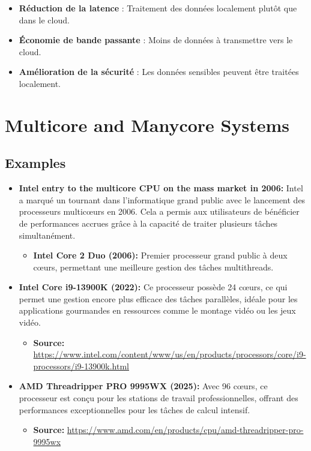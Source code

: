 \documentclass[10pt,a4paper]{article}
\begin{document}
\begin{itemize}
    \item \textbf{Réduction de la latence} : Traitement des données localement plutôt que dans le cloud.
    \item \textbf{Économie de bande passante} : Moins de données à transmettre vers le cloud.
    \item \textbf{Amélioration de la sécurité} : Les données sensibles peuvent être traitées localement.
\end{itemize}


\section*{Multicore and Manycore Systems}

\subsection*{Examples}

\begin{itemize}
    \item \textbf{Intel entry to the multicore CPU on the mass market in 2006:}
    Intel a marqué un tournant dans l'informatique grand public avec le lancement des processeurs multicœurs en 2006. Cela a permis aux utilisateurs de bénéficier de performances accrues grâce à la capacité de traiter plusieurs tâches simultanément.
    \begin{itemize}
        \item \textbf{Intel Core 2 Duo (2006):} Premier processeur grand public à deux cœurs, permettant une meilleure gestion des tâches multithreads.
    \end{itemize}

    \item \textbf{Intel Core i9-13900K (2022):}
    Ce processeur possède 24 cœurs, ce qui permet une gestion encore plus efficace des tâches parallèles, idéale pour les applications gourmandes en ressources comme le montage vidéo ou les jeux vidéo.
    \begin{itemize}
        \item \textbf{Source:} \url{https://www.intel.com/content/www/us/en/products/processors/core/i9-processors/i9-13900k.html}
    \end{itemize}

    \item \textbf{AMD Threadripper PRO 9995WX (2025):}
    Avec 96 cœurs, ce processeur est conçu pour les stations de travail professionnelles, offrant des performances exceptionnelles pour les tâches de calcul intensif.
    \begin{itemize}
        \item \textbf{Source:} \url{https://www.amd.com/en/products/cpu/amd-threadripper-pro-9995wx}
    \end{itemize}
\end{itemize}
\end{document}
